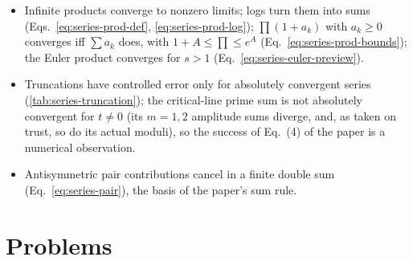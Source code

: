 \begin{itemize}
\item Infinite products converge to nonzero limits; logs turn them into sums (Eqs.~\eqref{eq:series-prod-def}, \eqref{eq:series-prod-log}); $\prod(1+a_k)$ with $a_k\ge0$ converges iff $\sum a_k$ does, with $1+A\le\prod\le e^A$ (Eq.~\eqref{eq:series-prod-bounds}); the Euler product converges for $s>1$ (Eq.~\eqref{eq:series-euler-preview}).
\item Truncations have controlled error only for absolutely convergent series (\cref{tab:series-truncation}); the critical-line prime sum is not absolutely convergent for $t\ne0$ (its $m=1,2$ amplitude sums diverge, and, as taken on trust, so do its actual moduli), so the success of Eq.~(4) of the paper is a numerical observation.
\item Antisymmetric pair contributions cancel in a finite double sum (Eq.~\eqref{eq:series-pair}), the basis of the paper's sum rule.
\end{itemize}

\section{Problems}

